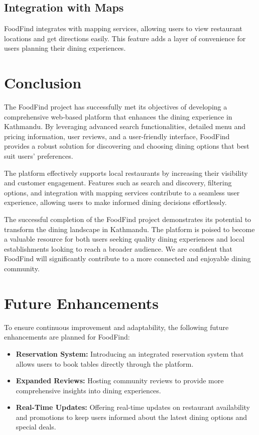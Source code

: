 \documentclass[12pt, a4paper, oneside]{article}
\begin{document}
\subsection{Integration with Maps}
FoodFind integrates with mapping services, allowing users to view restaurant locations and get directions easily. This feature adds a layer of convenience for users planning their dining experiences.
\pagebreak


\section{Conclusion}

The FoodFind project has successfully met its objectives of developing a comprehensive web-based platform that enhances the dining experience in Kathmandu. By leveraging advanced search functionalities, detailed menu and pricing information, user reviews, and a user-friendly interface, FoodFind provides a robust solution for discovering and choosing dining options that best suit users' preferences.

The platform effectively supports local restaurants by increasing their visibility and customer engagement. Features such as search and discovery, filtering options, and integration with mapping services contribute to a seamless user experience, allowing users to make informed dining decisions effortlessly.

The successful completion of the FoodFind project demonstrates its potential to transform the dining landscape in Kathmandu. The platform is poised to become a valuable resource for both users seeking quality dining experiences and local establishments looking to reach a broader audience. We are confident that FoodFind will significantly contribute to a more connected and enjoyable dining community.
\pagebreak

\section{Future Enhancements}

To ensure continuous improvement and adaptability, the following future enhancements are planned for FoodFind:

\begin{itemize}
  
    \item \textbf{Reservation System:} Introducing an integrated reservation system that allows users to book tables directly through the platform.
    \item \textbf{Expanded Reviews:} Hosting community reviews to provide more comprehensive insights into dining experiences.
    \item \textbf{Real-Time Updates:} Offering real-time updates on restaurant availability and promotions to keep users informed about the latest dining options and special deals.
\end{itemize}
\end{document}
